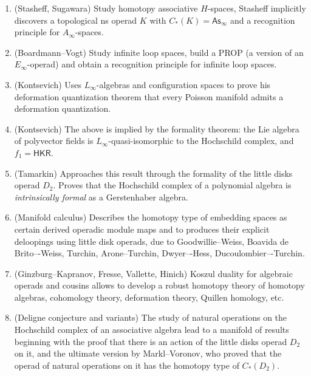 \documentclass[fleqn, a4paper, twoside]{article}
\newcommand{\0}{\langle 0\rangle}
\newenvironment{tenumerate}{
 \begin{enumerate}
  \setlength{\itemsep}{0pt}
  \setlength{\parskip}{0pt}
}{\end{enumerate}}
\DeclareRobustCommand{\[}{\begin{equation}}%
\DeclareRobustCommand{\]}{\end{equation}}%
\theoremstyle{mytheorem}
\theoremstyle{introthm}
\theoremstyle{mydefinition}
\theoremstyle{mydefinition2}
\theoremstyle{plain} %
\newcommand{\?}{\,?\,}
\theoremstyle{mytheorem}
\theoremstyle{plain} %
\begin{document}
\begin{tenumerate}
\item (Stasheff, Sugawara) Study homotopy associative 
$H$-spaces, Stasheff implicitly discovers a topological
ns operad $K$ with $C_*(K) = \mathsf{As}_\infty$ and a
recognition principle for $A_\infty$-spaces.

\item (Boardmann--Vogt) Study infinite loop spaces,
build a PROP (a version of an $E_\infty$-operad) 
and obtain a recognition principle for infinite
loop spaces.

\item (Kontsevich) Uses $L_\infty$-algebras and
configuration spaces to prove his deformation
quantization theorem that every Poisson manifold
admits a deformation quantization.

\item (Kontsevich) The above is
implied by the formality theorem: the
Lie algebra of polyvector fields is 
$L_\infty$-quasi-isomorphic to the Hochschild
complex, and $f_1 = \mathsf{HKR}$. 

\item (Tamarkin) Approaches this result through 
the formality of the little disks operad $D_2$.
Proves that the Hochschild complex of a polynomial
algebra is \emph{intrinsically formal} as a 
Gerstenhaber algebra.

\item (Manifold calculus) Describes the
homotopy type of embedding spaces as certain 
derived operadic module maps and to
produces their explicit deloopings
using little disk operads, due to 
Goodwillie--Weiss, Boavida de Brito–-Weiss,
Turchin, Arone--Turchin, Dwyer–-Hess,
Ducoulombier–-Turchin. 

\item (Ginzburg--Kapranov, Fresse,
Vallette, Hinich) Koszul duality for algebraic 
operads and cousins allows to develop a robust 
homotopy theory of homotopy algebras, cohomology
theory, deformation theory, Quillen homology, etc. 

\item (Deligne conjecture and variants) The study
of natural operations on the Hochschild complex
of an associative algebra lead to a manifold of 
results beginning with the proof that there is
an action of the little disks operad $D_2$ on
it, and the ultimate version by Markl--Voronov,
who proved that the operad of natural operations
on it has the homotopy type of $C_*(D_2)$.  
\end{tenumerate}
\end{document}
